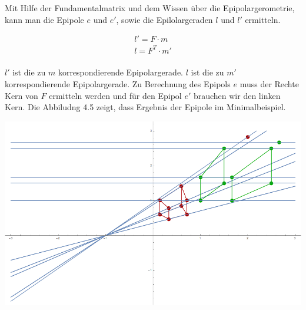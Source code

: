 Mit Hilfe der Fundamentalmatrix und dem Wissen über die Epipolargerometrie, kann man die Epipole \ensuremath{e} und \ensuremath{e'}, sowie die Epilolargeraden \ensuremath{l} und \ensuremath{l'} ermitteln.





\begin{gather}
l' = F \cdot m\\
l = F^T \cdot m'
\end{gather}\\

\ensuremath{l'} ist die zu \ensuremath{m} korrespondierende Epipolargerade. \ensuremath{l} ist die zu \ensuremath{m'} korrespondierende Epipolargerade. Zu Berechnung des Epipols \ensuremath{e} muss der Rechte Kern von $F$ ermitteln werden und für den Epipol \ensuremath{e'} brauchen wir den linken Kern. Die Abbiludng 4.5 zeigt, dass Ergebnis der Epipole im Minimalbeispiel. 

%

\begin{minipage}{\linewidth}
	\centering
	\includegraphics[width=1.\linewidth]{images/Epipole_Epipollinien.png}
\end{minipage}\\ \\

